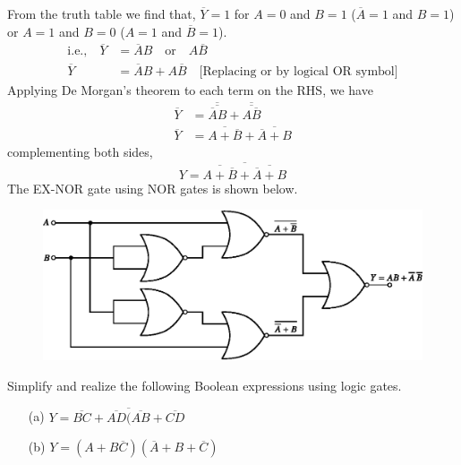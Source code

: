\begin{solution}
\begin{itemize}
From the truth table we find that, $\overline{Y}=1$ for $A=0$ and
$B=1$ ($\overline{A}=1$ and $B=1$) or $A=1$ and $B=0$ ($A=1$ and
$\overline{B}=1$).
\begin{align*}
\text{i.e.,}\quad \overline{Y} &= \overline{A}B\quad\text{or}\quad
A\overline{B}\\[3pt]
\overline{Y} &= \overline{A}B+A\overline{B}\quad \text{[Replacing or
    by logical OR symbol]} 
\end{align*}
Applying De Morgan's theorem to each term on the RHS, we have
\begin{align*}
\overline{Y}
&=\overline{\overline{\overline{A}B}}+\overline{\overline{A\overline{B}}}\\[3pt]
\overline{Y} &= \overline{A+\overline{B}}+\overline{\overline{A}+B}
\end{align*}
complementing both sides,
$$
Y=\overline{\overline{A+\overline{B}}+\overline{\overline{A}+B}}
$$
The EX-NOR gate using NOR gates is shown below.
\begin{figure}[H]
\centering
\includegraphics{chap6/fig109.eps}
\end{figure}
\end{itemize}
\vskip -1cm
\end{solution}

\smallskip
\begin{example}\label{exam6.29}
Simplify and realize the following Boolean expressions using logic gates.
\begin{itemize}
\item[(a)] $Y=\overline{\overline{BC}+\overline{AD}(\overline{AB}+\overline{CD}}$

\item[(b)] $Y=(A+B\overline{C})(\overline{A}+B+\overline{C})$
\end{itemize}
\end{example}


